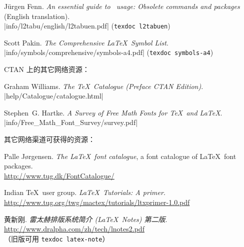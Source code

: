 \begin{thebibliography}{20}
 J\"{u}rgen Fenn.
  \newblock \emph{An essential guide to \LaTeXe\ usage: Obsolete commands and packages} (English translation). \\
  \newblock \CTAN|info/l2tabu/english/l2tabuen.pdf| (\texttt{texdoc l2tabuen})

 Scott Pakin.
  \newblock \emph{The Comprehensive \LaTeX\ Symbol List}. \\
  \newblock \CTAN|info/symbols/comprehensive/symbols-a4.pdf| (\texttt{texdoc symbols-a4})

\item[\textbullet] CTAN 上的其它网络资源：

 Graham Williams.
  \newblock \emph{The \TeX\ Catalogue (Preface CTAN Edition)}.\\
  \newblock \CTAN|help/Catalogue/catalogue.html|

 Stephen~G. Hartke.
  \newblock \emph{A Survey of Free Math Fonts for \TeX\ and \LaTeX}.\\
  \newblock \CTAN|info/Free_Math_Font_Survey/survey.pdf|

\item[\textbullet] 其它网络渠道可获得的资源：

 Palle J{\o}rgensen.
  \newblock \emph{The \LaTeX\ font catalogue}, a font catalogue of \LaTeX\ font packages.\\
  \newblock \url{http://www.tug.dk/FontCatalogue/}

 Indian \TeX\ user group. 
  \newblock \emph{\LaTeX\ Tutorials: A primer}. \\
  \newblock \url{http://www.tug.org/twg/mactex/tutorials/ltxprimer-1.0.pdf}

 黄新刚. 
  \newblock \emph{雷太赫排版系统简介 (\LaTeX\ Notes) 第二版}. \\
  \newblock \url{http://www.dralpha.com/zh/tech/lnotes2.pdf} \\
  （旧版可用 \texttt{texdoc latex-note}）

\end{thebibliography}

\endinput